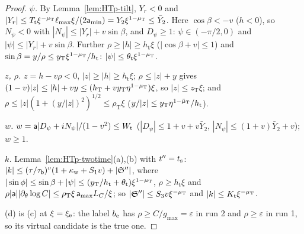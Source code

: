 \begin{proof}
\emph{$\psi$.} By Lemma~\ref{lem:HTp-tilt}, $Y_r<0$ and $|Y_r|\le T_{\mathrm t}\xi^{-\mu_{\mathrm T}}\ell_{\max}\xi/(2\mathsf a_{\min})=Y_2\xi^{1-\mu_{\mathrm T}}\le
\bar Y_2$. Here $\cos\beta<-v$ ($h<0$), so $N_\psi<0$ with $|N_\psi|\le|Y_r|+v\sin\beta$, and $D_\psi\ge1$: $\psi\in(-\pi/2,0)$ and
$|\psi|\le|Y_r|+v\sin\beta$. Further $\rho\ge|h|\ge h_{\mathrm t}\xi$ ($|\cos\beta+v|\le1$) and
$\sin\beta=y/\rho\le y_{\mathrm T}\xi^{1-\mu_{\mathrm T}}/h_{\mathrm t}$: $|\psi|\le\theta_{\mathrm t}\xi^{1-\mu_{\mathrm T}}$.

\emph{$z$, $\rho$.} $z=h-v\rho<0$, $|z|\ge|h|\ge h_{\mathrm t}\xi$; $\rho\le|z|+y$ gives $(1-v)|z|\le|h|+vy\le
(h_{\mathrm T}+vy_{\mathrm T}\eta^{1-\mu_{\mathrm T}})\xi$, so $|z|\le z_{\mathrm T}\xi$; and $\rho\le|z|(1+(y/|z|)^2)^{1/2}\le\rho_{\mathrm T}\xi$
($y/|z|\le y_{\mathrm T}\eta^{1-\bar\mu_{\mathrm T}}/h_{\mathrm t}$).

\emph{$w$.} $w=\mathsf a|D_\psi+iN_\psi|/(1-v^2)\le W_{\mathrm t}$ ($|D_\psi|\le1+v+v\bar Y_2$, $|N_\psi|\le(1+v)\bar Y_2+v$); $w\ge1$.

\emph{$k$.} Lemma~\ref{lem:HTp-twotime}(a),(b) with $t''=t_{\mathrm s}$: $|k|\le(\tau/\tau_{\mathsf b})^v(1+\kappa_{\mathrm w}+S_1v)+|\mathfrak S''|$, where
$|\sin\phi|\le\sin\beta+|\psi|\le(y_{\mathrm T}/h_{\mathrm t}+\theta_{\mathrm t})\xi^{1-\mu_{\mathrm T}}$, $\rho\ge h_{\mathrm t}\xi$ and
$\rho|\mathsf a||\partial_\theta\log C|\le\rho_{\mathrm T}\xi\,\mathsf a_{\max}L_C/\xi$; so $|\mathfrak S''|\le S_3v\xi^{-\mu_{\mathrm T}}$ and
$|k|\le K_{\mathrm t}\xi^{-\mu_{\mathrm T}}$.

(d) is (c) at $\xi=\xi_{\mathrm e}$: the label $b_{\mathrm e}$ has $\rho\ge C/g_{\max}=\varepsilon$ in run 2 and $\rho\ge\varepsilon$ in run 1, so its virtual
candidate is the true one.


\end{proof}
